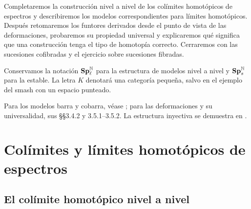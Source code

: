 
Completaremos la construcción nivel a nivel de los colímites homotópicos de espectros y describiremos los modelos correspondientes para límites homotópicos. Después retomaremos los funtores derivados desde el punto de vista de las deformaciones, probaremos su propiedad universal y explicaremos qué significa que una construcción tenga el tipo de homotopía correcto. Cerraremos con las sucesiones cofibradas y el ejercicio sobre sucesiones fibradas.

Conservamos la notación $\mathbf{Sp}^{\mathbb N}_{\ell}$ para la estructura de modelos nivel a nivel y $\mathbf{Sp}^{\mathbb N}_s$ para la estable. La letra $K$ denotará una categoría pequeña, salvo en el ejemplo del smash con un espacio punteado.

Para los modelos barra y cobarra, véase \cite[\S8.3.4 y \S\S8.5.1--8.5.5]{malkiewich}; para las deformaciones y su universalidad, sus \S\S3.4.2 y 3.5.1--3.5.2. La estructura inyectiva se demuestra en \cite[proposición~A.2.8.2 y lema~A.3.3.3]{lurie2009}.

\section{Colímites y límites homotópicos de espectros}

\subsection{El colímite homotópico nivel a nivel}

